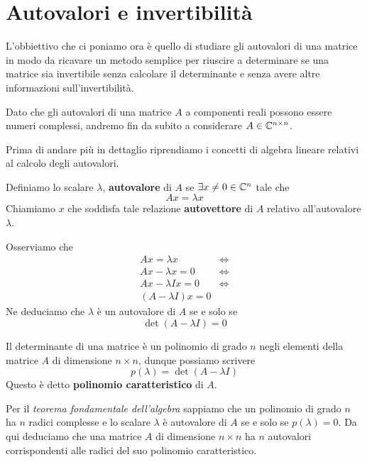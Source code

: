 \section{Autovalori e invertibilità}
L'obbiettivo che ci poniamo ora è quello di studiare gli autovalori di una matrice in modo da ricavare un metodo
semplice per riuscire a determinare se una matrice sia invertibile senza calcolare il determinante e senza avere
altre informazioni sull'invertibilità.

Dato che gli autovalori di una matrice $A$ a componenti reali possono essere numeri complessi, andremo fin da
subito a considerare $A \in \mathbb{C}^{n \times n}$.

Prima di andare più in dettaglio riprendiamo i concetti di algebra lineare relativi al calcolo degli autovalori.

\begin{definition}
	Definiamo lo scalare $\lambda$, \textbf{autovalore} di $A$ se $\exists x \neq 0 \in \mathbb{C}^n$ tale che
	\[ A x = \lambda x \]
	Chiamiamo $x$ che soddisfa tale relazione \textbf{autovettore} di $A$ relativo all'autovalore $\lambda$.
\end{definition}

\begin{observation}
	Osserviamo che
	\begin{align*}
		A x = \lambda x       & \Leftrightarrow \\
		A x - \lambda x = 0   & \Leftrightarrow \\
		A x - \lambda I x = 0 & \Leftrightarrow \\
		(A - \lambda I) x = 0
	\end{align*}
	Ne deduciamo che $\lambda$ è un autovalore di $A$ se e solo se
	\[ \det (A - \lambda I) = 0 \]
\end{observation}

\begin{definition}
	Il determinante di una matrice è un polinomio di grado $n$ negli elementi della matrice $A$ di dimensione
	$n \times n$, dunque possiamo scrivere
	\[ p(\lambda) = \det (A - \lambda I) \]
	Questo è detto \textbf{polinomio caratteristico} di $A$.
\end{definition}

Per il \emph{teorema fondamentale dell'algebra} sappiamo che un polinomio di grado $n$ ha $n$ radici complesse
e lo scalare $\lambda$ è autovalore di $A$ se e solo se $p(\lambda) = 0$. Da qui deduciamo che una matrice $A$
di dimensione $n \times n$ ha $n$ autovalori corrispondenti alle radici del suo polinomio caratteristico.

